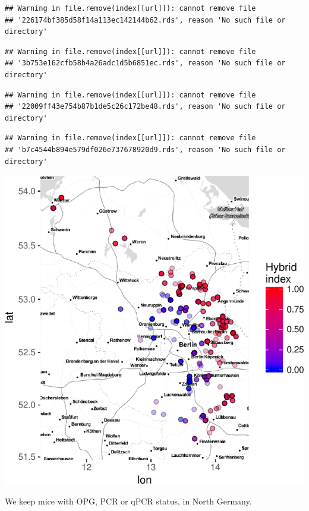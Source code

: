 \documentclass[]{article}
\begin{document}
\begin{verbatim}
## Warning in file.remove(index[[url]]): cannot remove file
## '226174bf385d58f14a113ec142144b62.rds', reason 'No such file or directory'
\end{verbatim}

\begin{verbatim}
## Warning in file.remove(index[[url]]): cannot remove file
## '3b753e162cfb58b4a26adc1d5b6851ec.rds', reason 'No such file or directory'
\end{verbatim}

\begin{verbatim}
## Warning in file.remove(index[[url]]): cannot remove file
## '22009ff43e754b87b1de5c26c172be48.rds', reason 'No such file or directory'
\end{verbatim}

\begin{verbatim}
## Warning in file.remove(index[[url]]): cannot remove file
## 'b7c4544b894e579df026e737678920d9.rds', reason 'No such file or directory'
\end{verbatim}

\includegraphics{Data_Analysis_Alice_files/figure-latex/generalstats_3.75-1.pdf}

We keep mice with OPG, PCR or qPCR status, in North Germany.
\end{document}
